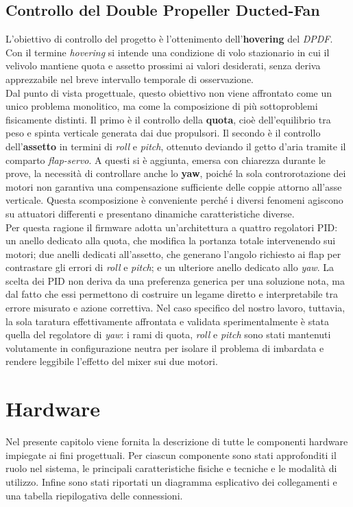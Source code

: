 \documentclass[11pt]{report}
\begin{document}
	\section{Controllo del Double Propeller Ducted-Fan}
	L'obiettivo di controllo del progetto è l'ottenimento dell'\textbf{hovering} del \textit{DPDF}. Con il termine \textit{hovering} si intende una condizione di volo stazionario in cui il velivolo mantiene quota e assetto prossimi ai valori desiderati, senza deriva apprezzabile nel breve intervallo temporale di osservazione.\\
	Dal punto di vista progettuale, questo obiettivo non viene affrontato come un unico problema monolitico, ma come la composizione di più sottoproblemi fisicamente distinti. Il primo è il controllo della \textbf{quota}, cioè dell'equilibrio tra peso e spinta verticale generata dai due propulsori. Il secondo è il controllo dell'\textbf{assetto} in termini di \textit{roll} e \textit{pitch}, ottenuto deviando il getto d'aria tramite il comparto \textit{flap-servo}. A questi si è aggiunta, emersa con chiarezza durante le prove, la necessità di controllare anche lo \textbf{yaw}, poiché la sola controrotazione dei motori non garantiva una compensazione sufficiente delle coppie attorno all'asse verticale. Questa scomposizione è conveniente perché i diversi fenomeni agiscono su attuatori differenti e presentano dinamiche caratteristiche diverse.\\
	Per questa ragione il firmware adotta un'architettura a quattro regolatori PID: un anello dedicato alla quota, che modifica la portanza totale intervenendo sui motori; due anelli dedicati all'assetto, che generano l'angolo richiesto ai flap per contrastare gli errori di \textit{roll} e \textit{pitch}; e un ulteriore anello dedicato allo \textit{yaw}. La scelta dei PID non deriva da una preferenza generica per una soluzione nota, ma dal fatto che essi permettono di costruire un legame diretto e interpretabile tra errore misurato e azione correttiva. Nel caso specifico del nostro lavoro, tuttavia, la sola taratura effettivamente affrontata e validata sperimentalmente è stata quella del regolatore di \textit{yaw}: i rami di quota, \textit{roll} e \textit{pitch} sono stati mantenuti volutamente in configurazione neutra per isolare il problema di imbardata e rendere leggibile l'effetto del mixer sui due motori.
	
	\newpage
	\chapter{Hardware}
	\label{Hardware}
	Nel presente capitolo viene fornita la descrizione di tutte le componenti hardware
	impiegate ai fini progettuali.
	Per ciascun componente sono stati approfonditi il ruolo nel sistema, le principali
	caratteristiche fisiche e tecniche e le modalità di utilizzo. Infine sono stati riportati un
	diagramma esplicativo dei collegamenti e una tabella riepilogativa delle connessioni.
\end{document}
